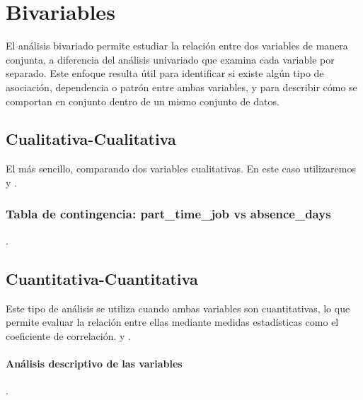 \section{Bivariables}
El análisis bivariado permite estudiar la relación entre dos variables de manera conjunta, a
diferencia del análisis univariado que examina cada variable por separado. Este enfoque resulta
útil para identificar si existe algún tipo de asociación, dependencia o patrón entre ambas
variables, y para describir cómo se comportan en conjunto dentro de un mismo conjunto de datos.

\subsection{Cualitativa-Cualitativa}
El más sencillo, comparando dos variables cualitativas. En este caso utilizaremos
 y .


\subsubsection{Tabla de contingencia: part\_time\_job vs absence\_days}
.





\subsection{Cuantitativa-Cuantitativa}
Este tipo de análisis se utiliza cuando ambas variables son cuantitativas, lo que permite evaluar la relación entre ellas mediante medidas estadísticas como el coeficiente de correlación.
 y .

\paragraph{Análisis descriptivo de las variables}.

